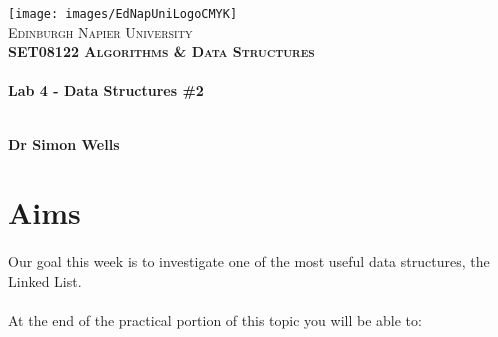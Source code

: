 \documentclass[10pt, a4paper, twosize]{article}
\begin{document}

\begin{titlepage}
\vspace*{5cm}
\begin{center}
\texttt{[image: images/EdNapUniLogoCMYK]}~\\[1cm]

\textsc{\Large Edinburgh Napier University}\\[1.5cm]

\textsc{\LARGE \bfseries SET08122 Algorithms \& Data Structures}\\[0.5cm]

\hrulefill \\[0.4cm]
{\huge \bfseries Lab 4 - Data Structures \#2 \\[0.4cm] }
\hrulefill \\[1.5cm]

\begin{minipage}{0.4\textwidth}
\begin{flushleft} \large
\textbf{Dr Simon Wells} \\
\end{flushleft}
\end{minipage}

\vfill

\end{center}
\end{titlepage}




%

\section{Aims}
\paragraph{} Our goal this week is to investigate one of the most useful data structures, the Linked List. 


\paragraph{} At the end of the practical portion of this topic you will be able to:
\end{document}
